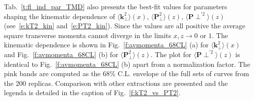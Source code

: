 \documentclass[aps,preprintnumbers,showpacs,nofootinbib,superscriptaddress,floatfix]{revtex4}
\newcommand{\T}{\perp}
\begin{document}
Tab.~\ref{t:fl_ind_par_TMD} also presents the best-fit values for parameters shaping the kinematic dependence of $\big \langle \bm{k}_{\T}^2 \big \rangle (x)$, $\big \langle \bm{P}_{\perp}^2 \big \rangle (z)$, $\big \langle \bm{P}{\perp}^{\prime 2} \big \rangle (z)$ (see~\eqref{e:kT2_kin} and~\eqref{e:PT2_kin}). Since the values are all positive the average square transverse momenta cannot diverge in the limits $x,z \to 0$ or $1$. 
The kinematic dependence is shown in Fig.~\ref{f:avmomenta_68CL} (a) for $\big \langle \bm{k}_{\T}^2 \big \rangle (x)$ and Fig.~\ref{f:avmomenta_68CL} (b) for $\big \langle \bm{P}_{\perp}^2 \big \rangle (z)$. The plot for $\big \langle \bm{P}{\perp}^{\prime 2} \big \rangle (z)$ is identical to Fig.~\ref{f:avmomenta_68CL} (b) apart from a normalization factor. 
The pink bands are computed as the $68\%$ C.L.  envelope of the full sets of curves from the 200 replicas. Comparison with other extractions are presented and the legenda is detailed in the caption of Fig.~\ref{f:kT2_vs_PT2}.\\
\end{document}
